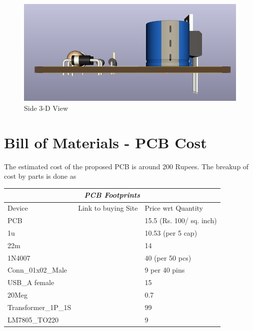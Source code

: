 \documentclass{article}
\begin{document}
\begin{figure}[h!]
\centerline{\includegraphics[scale=.6]{Images/d.png}}
\caption{Side 3-D View}
\label{figb}
\end{figure}


\section{Bill of Materials - PCB Cost}

The estimated cost of the proposed PCB is around 200 Rupees. The breakup of cost by parts is done as

\begin{table}
    \centering
    \begin{tabular}{|l|l|l|}
    \hline
    \multicolumn{3}{|c|}{\textbf{\textit{PCB Footprints}}} \\
    \hline
    \hline
        Device & Link to buying Site & Price wrt Quantity \\ \hline
        PCB                 & \cite{noauthor_1_cost_nodate} & 15.5 (Rs. 100/ sq. inch) \\
        1u                  & \cite{noauthor_2_cost_nodate} & 10.53 (per 5 cap)        \\
        22m                 & \cite{noauthor_3_cost_nodate} & 14                       \\
        1N4007              & \cite{noauthor_4_cost_nodate} & 40 (per 50 pcs)          \\
        Conn\_01x02\_Male   & \cite{noauthor_5_cost_nodate} & 9 per 40 pins            \\
        USB\_A female       & \cite{noauthor_6_cost_nodate} & 15                       \\
        20Meg               & \cite{noauthor_7_cost_nodate} & 0.7                      \\
        Transformer\_1P\_1S & \cite{noauthor_8_cost_nodate} & 99                       \\
        LM7805\_TO220       & \cite{noauthor_9_cost_nodate} & 9 \\
        \hline
        
    \end{tabular}
\end{table}
\end{document}
